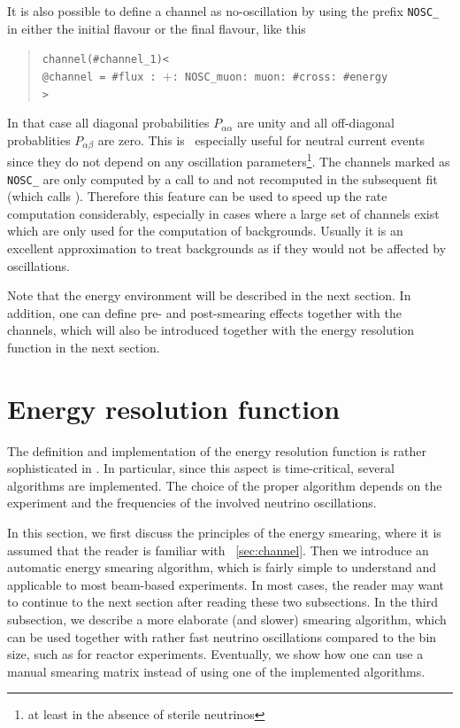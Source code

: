 It is also possible to define a channel as no-oscillation by using the
prefix {\tt NOSC\_} 
in either the initial  flavour or 
the final flavour, like this
\begin{quote}
{\tt channel(\#channel\_1)<\\
\tb @channel = \#flux : $+$: NOSC\_muon: muon: \#cross: \#energy\\
>}
\end{quote}

 In that case
all diagonal probabilities $P_{\alpha\alpha}$ are unity and all off-diagonal
probablities  $P_{\alpha\beta}$ are zero. This is \eg\ especially useful for
neutral current events since they do not depend on any oscillation 
parameters\footnote{at least in the absence of sterile neutrinos}. The channels
marked as {\tt NOSC\_} are only computed by a call to 
and not recomputed in the subsequent fit (which calls ).
Therefore this feature can be used to speed up the rate 
computation considerably, especially in cases where a large set
of channels exist which are only used for the computation of backgrounds.
Usually it is an excellent approximation to treat backgrounds as if they
would not be affected by oscillations.



Note that the energy environment will be described in the next section. 
In addition, one can define pre- and post-smearing effects together
with the channels, which will also be introduced together with the
energy resolution function in the next section.

\section{Energy resolution function}
\label{sec:energy}

The definition and implementation of the energy resolution function is 
rather sophisticated in \GLOBES . In particular, since this aspect is 
 time-critical, several algorithms are implemented. The choice of the 
proper algorithm depends on the experiment and the frequencies of the
 involved neutrino oscillations.

In this section, we first discuss the principles of the energy smearing, where it is assumed that the reader is familiar with \Sec~\ref{sec:channel}. Then we introduce an automatic energy smearing algorithm, which is fairly simple to understand and applicable to most beam-based experiments. 
In most cases, the reader may want to continue to the next section after reading these two subsections. In the third subsection, we describe a more elaborate (and slower) smearing algorithm, which can be used together with rather fast neutrino oscillations compared to the bin size, such as for reactor experiments. Eventually, we show how one can use a manual smearing matrix instead of using one of the implemented algorithms.

